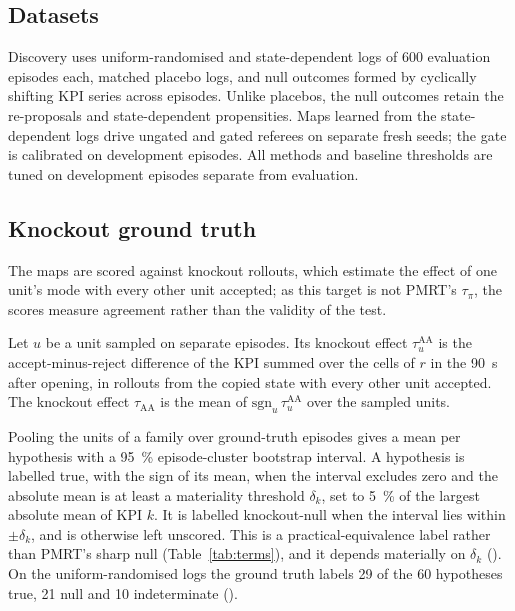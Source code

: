 \subsection{Datasets}
\label{sec:datasets}

Discovery uses uniform-randomised and state-dependent logs of 600 evaluation episodes each, matched placebo logs, and
null outcomes formed by cyclically shifting KPI series across episodes. Unlike placebos, the null outcomes retain the
re-proposals and state-dependent propensities. Maps learned from the state-dependent logs drive ungated and gated
referees on separate fresh seeds; the gate is calibrated on  development episodes. All
methods and baseline thresholds are tuned on development episodes separate from evaluation.

\subsection{Knockout ground truth}
\label{sec:gt}

The maps are scored against knockout rollouts, which estimate the effect of one unit's mode with every other unit
accepted; as this target is not PMRT's $\tau_{\pi}$, the scores measure agreement rather than the validity of the
test.

\begin{definition}
\label{def:tau_aa}
Let $u$ be a unit sampled on separate episodes. Its knockout effect $\tau_u^{\mathrm{AA}}$ is the accept-minus-reject
difference of the KPI summed over the cells of $r$ in the 90~s after opening, in rollouts from the copied state with
every other unit accepted. The knockout effect $\tau_{\mathrm{AA}}$ is the mean of $\mathrm{sgn}_u\,
\tau_u^{\mathrm{AA}}$ over the sampled units.
\end{definition}

Pooling the units of a family over  ground-truth episodes gives a mean per hypothesis with a 95~\%
episode-cluster bootstrap interval. A hypothesis is labelled true, with the sign of its mean, when the interval
excludes zero and the absolute mean is at least a materiality threshold $\delta_k$, set to 5~\% of the largest
absolute mean of KPI $k$. It is labelled knockout-null when the interval lies within $\pm\delta_k$, and is otherwise
left unscored. This is a practical-equivalence label rather than PMRT's sharp null (Table~\ref{tab:terms}), and it
depends materially on $\delta_k$ (). On the uniform-randomised logs the ground truth labels 29 of the 60 hypotheses true, 21 null and 10
indeterminate ().

